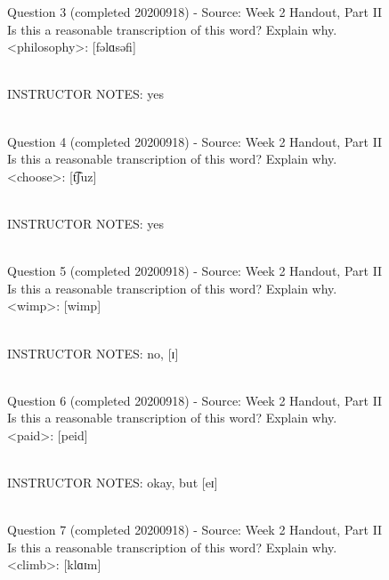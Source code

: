 \documentclass[12pt]{article}
\begin{document}
{\large Question 3} (completed 20200918) - Source: Week 2 Handout, Part II\\

Is this a reasonable transcription of this word? Explain why.\\

<philosophy>: {[fəlɑsəfi]}


~\\
INSTRUCTOR NOTES: yes


~\\

{\large Question 4} (completed 20200918) - Source: Week 2 Handout, Part II\\

Is this a reasonable transcription of this word? Explain why.\\

<choose>: {[t͡ʃuz]}


~\\
INSTRUCTOR NOTES: yes


~\\

{\large Question 5} (completed 20200918) - Source: Week 2 Handout, Part II\\

Is this a reasonable transcription of this word? Explain why.\\

<wimp>: {[wimp]}


~\\
INSTRUCTOR NOTES: no, [ɪ]


~\\

{\large Question 6} (completed 20200918) - Source: Week 2 Handout, Part II\\

Is this a reasonable transcription of this word? Explain why.\\

<paid>: {[peid]}


~\\
INSTRUCTOR NOTES: okay, but [eɪ]


~\\

{\large Question 7} (completed 20200918) - Source: Week 2 Handout, Part II\\

Is this a reasonable transcription of this word? Explain why.\\

<climb>: {[klɑɪm]}
\end{document}

